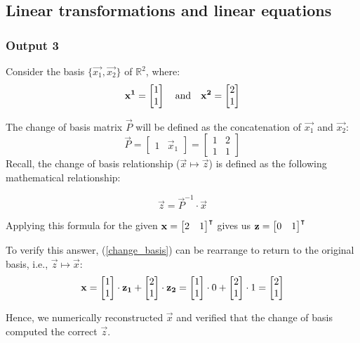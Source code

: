 \documentclass[10pt]{article}
\begin{document}
\subsection{Linear transformations and linear equations}
\subsubsection{Output 3}
Consider the basis $\{\vec{x_1}, \vec{x_2}\}$ of $\mathbb{R}^2$, where:
\begin{equation*}
    \mathbf{x^1} = \begin{bmatrix} 1\\1 \end{bmatrix}
    \quad
    \text{and}
    \quad
    \mathbf{x^2} = \begin{bmatrix} 2\\1 \end{bmatrix}
\end{equation*}

The change of basis matrix $\vec{P}$ will be defined as the concatenation of $\vec{x_1}$ and $\vec{x_2}$:
\begin{equation*}
    \vec{P} =
        \begin{bmatrix}
            1 & \vec{x}_1
        \end{bmatrix} = 
        \begin{bmatrix}
            1 & 2\\1 & 1
        \end{bmatrix}
\end{equation*}
Recall, the change of basis relationship ($\vec{x} \mapsto \vec{z} $)  is defined as the following mathematical relationship:

\begin{equation} \label{change_basis}
    \vec{z} = \vec{P}^{-1} \cdot \vec{x}
\end{equation}

Applying this formula for the given $\mathbf{x} = \begin{bmatrix} 2&1 \end{bmatrix}^\intercal$ gives us $\mathbf{z} = \begin{bmatrix} 0 & 1 \end{bmatrix}^\intercal$

To verify this answer, (\ref{change_basis}) can be rearrange to return to the original basis, i.e., $\vec{z} \mapsto \vec{x} $:
\begin{equation*}
    \mathbf{x} = \begin{bmatrix} 1\\1 \end{bmatrix}\cdot \mathbf{z_1} + \begin{bmatrix} 2\\1 \end{bmatrix} \cdot \mathbf{z_2} = \begin{bmatrix} 1\\1 \end{bmatrix}\cdot 0 + \begin{bmatrix} 2\\1 \end{bmatrix} \cdot 1 = \begin{bmatrix} 2\\1 \end{bmatrix}
\end{equation*}

Hence, we numerically reconstructed $\vec{x}$ and verified that the change of basis computed the correct $\vec{z}$.
\end{document}

